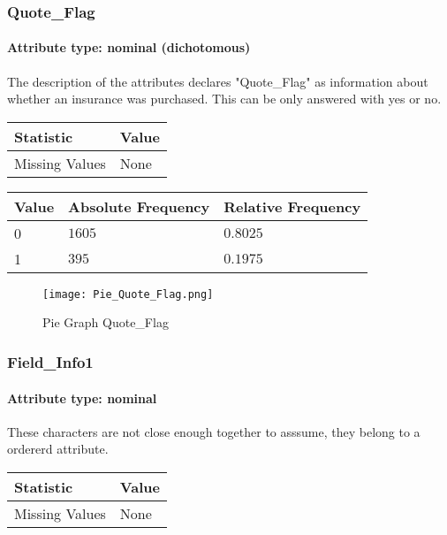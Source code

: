 \subsubsection{Quote\_Flag}
\paragraph{Attribute type: nominal (dichotomous)}
The description of the attributes declares "Quote\_Flag" as information about whether an insurance was purchased. This can be only answered with yes or no.

\begin{table}[H]
	\renewcommand{\arraystretch}{1.25}
	\begin{tabular}{l|l}
		\textbf{Statistic} & \textbf{Value}\\\hline
		Missing Values& None\\\hline
	\end{tabular}
\end{table}

\begin{table}[H]
	\renewcommand{\arraystretch}{1.25}
		\begin{tabular}{l|l|l}
			\textbf{Value} & \textbf{Absolute Frequency} & \textbf{Relative Frequency}\\\hline
			0 & $1605$ & $0.8025$\\ \hline
			1 & $395$ & $0.1975$\\
		\end{tabular}
\end{table}

\begin{figure}[H]
	\begin{center}
		\texttt{[image: Pie\_Quote\_Flag.png]}
	\end{center}
	\caption{Pie Graph Quote\_Flag}
\end{figure}


\subsubsection{Field\_Info1}
\paragraph{Attribute type: nominal} These characters are not close enough together to asssume, they belong to a ordererd attribute.

\begin{table}[H]
	\renewcommand{\arraystretch}{1.25}
	\begin{tabular}{l|l}
		\textbf{Statistic} & \textbf{Value}\\\hline
		Missing Values& None\\\hline
	\end{tabular}
\end{table}


